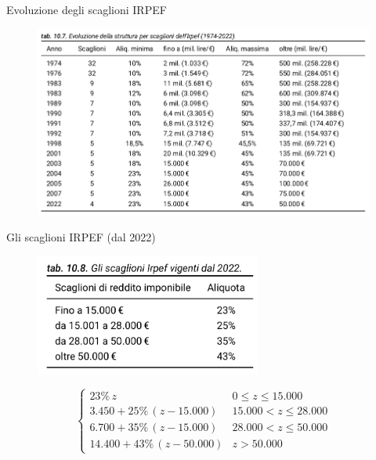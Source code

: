 \documentclass[aspectratio=64,11pt]{beamer}
\newcommand\€{\,\text{€}}
\begin{document}
\begin{frame}{Evoluzione degli scaglioni IRPEF}
\begin{figure}
\centering
\includegraphics[width=\linewidth]{./figure/evoluzione-scaglioni-IRPEF.png}
\end{figure}
\end{frame}


\begin{frame}{Gli scaglioni IRPEF (dal 2022)}
\begin{figure}
\centering
\includegraphics[height=4cm]{./figure/scaglioni-IRPEF-2022.png}
\end{figure}

\begin{equation*}
    \begin{cases}
    23\%\,z & 0\le z\le15.000\\
    3.450 + 25\%\,(z-15.000) & 15.000<z\le28.000\\
    6.700 + 35\%\,(z-15.000) & 28.000<z\le50.000\\
    14.400 + 43\%\,(z-50.000) & z > 50.000
  \end{cases}
\end{equation*}

\end{frame}
\end{document}

